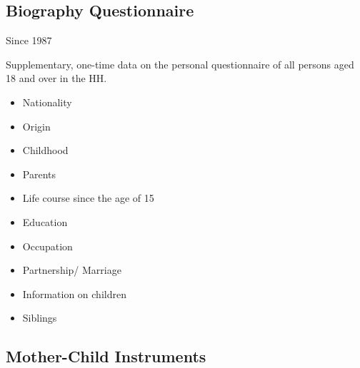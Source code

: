 \documentclass[letterpaper,10pt,openany,onesideH,english]{sphinxmanual}
\begin{document}


\subsection{Biography Questionnaire}
\label{\detokenize{Contents of SOEPcore/index:biography-questionnaire}}\label{\detokenize{Contents of SOEPcore/index:id24}}
 Since 1987

 Supplementary, one-time data on the personal questionnaire of all persons aged 18 and over in the HH.

\begin{itemize}
\item {} 
Nationality

\item {} 
Origin

\item {} 
Childhood

\item {} 
Parents

\item {} 
Life course since the age of 15

\item {} 
Education

\item {} 
Occupation

\item {} 
Partnership/ Marriage

\item {} 
Information on children

\item {} 
Siblings

\end{itemize}


\subsection{Mother-Child Instruments}
\label{\detokenize{Contents of SOEPcore/index:mother-child-instruments}}
\end{document}
